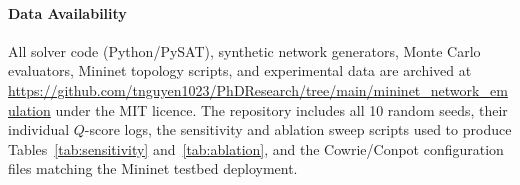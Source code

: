 \documentclass[journal]{IEEEtran}
\newcommand{\qscore}{$Q$-score}
\begin{document}
\paragraph{Data Availability}
All solver code (Python/PySAT), synthetic network generators, Monte
Carlo evaluators, Mininet topology scripts, and experimental data
are archived at\\
\url{https://github.com/tnguyen1023/PhDResearch/tree/main/mininet_network_emulation}
under the MIT licence. The repository includes all 10 random seeds,
their individual \qscore{} logs, the sensitivity and ablation sweep
scripts used to produce Tables~\ref{tab:sensitivity}
and~\ref{tab:ablation}, and the Cowrie/Conpot configuration files
matching the Mininet testbed deployment.


\end{document}
